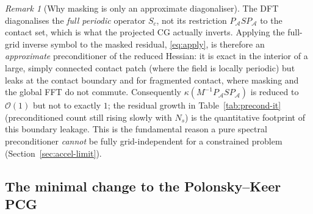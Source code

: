 \documentclass[11pt,a4paper]{article}
\newcommand{\Order}{\mathcal{O}}
\theoremstyle{definition}
\theoremstyle{remark}
\newtheorem{remark}{Remark}
\begin{document}
\begin{remark}[Why masking is only an approximate diagonaliser]
\label{rem:mask}
The DFT diagonalises the \emph{full periodic} operator $S_c$, not its restriction
$P_{\mathcal A}S P_{\mathcal A}$ to the contact set, which is what the projected
CG actually inverts. Applying the full-grid inverse symbol to the masked residual,
\eqref{eq:apply}, is therefore an \emph{approximate} preconditioner of the reduced
Hessian: it is exact in the interior of a large, simply connected contact patch
(where the field is locally periodic) but leaks at the contact boundary and for
fragmented contact, where masking and the global FFT do not commute. Consequently
$\kappa(M^{-1}P_{\mathcal A}SP_{\mathcal A})$ is reduced to $\Order(1)$ but not to
exactly $1$; the residual growth in Table~\ref{tab:precond-it} (preconditioned
count still rising slowly with $N_s$) is the quantitative footprint of this
boundary leakage. This is the fundamental reason a pure spectral preconditioner
\emph{cannot} be fully grid-independent for a constrained problem
(Section~\ref{sec:accel-limit}).
\end{remark}

\subsection{The minimal change to the Polonsky--Keer PCG}
\label{sec:pcg-change}
\end{document}
